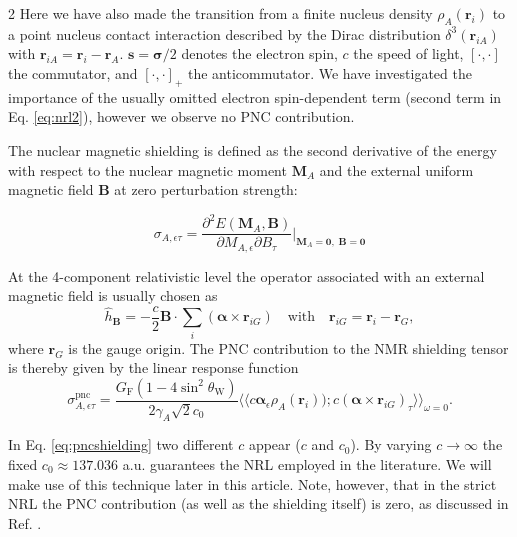 \documentclass[a4paper,12pt,english]{article}
\begin{document}
\begin{spacing}{2}
\noindent Here we have also made the transition from a finite nucleus density $\rho_A(\mathbf{r}_i)$ to a point nucleus contact interaction described by the Dirac distribution $\delta^3(\mathbf{r}_{iA})$ with $\mathbf{r}_{iA} = \mathbf{r}_i-\mathbf{r}_A$. \mbox{$\mathbf{s} = \boldsymbol{\sigma}/2$} denotes the electron spin, $c$ the speed of light, $[\cdot,\cdot]$ the commutator, and $[\cdot,\cdot]_+$ the anti\-commutator. We have investigated the importance of the usually omitted electron spin-dependent term (second term in Eq. \ref{eq:nrl2}), however we observe no PNC contribution.

\par The nuclear magnetic shielding is defined as the second derivative of the energy with respect to the nuclear magnetic moment $\mathbf{M}_A$ and the external uniform magnetic field $\mathbf{B}$ at zero perturbation strength:

\begin{equation}\label{eq:shielding}
  \sigma_{A,\epsilon\tau} = \frac{\partial^2E(\mathbf{M}_A,\mathbf{B})}{\partial{M_{A,\epsilon}}\partial{B_\tau}}\biggr|_{\mathbf{M}_A=\mathbf{0},\;\mathbf{B}=\mathbf{0}}
\end{equation}

\noindent At the 4-component relativistic level the operator associated with an external magnetic field is usually chosen as
\begin{equation}
\label{eq:hamiltonianB}
\hat{h}_\mathbf{B}=-\frac{c}{2}\mathbf{B}\cdot\sum_i\left(\boldsymbol{\alpha}\times\mathbf{r}_{iG}\right)
\quad\text{with} \quad \mathbf{r}_{iG} = \mathbf{r}_i-\mathbf{r}_G,
\end{equation}
where $\mathbf{r}_G$ is the gauge origin. The PNC contribution to the NMR shielding tensor is thereby given by the linear response function
\begin{equation}\label{eq:pncshielding}
  \sigma_{A,\epsilon\tau}^\text{pnc} = \frac{G_\text{F}(1-4\sin^2\theta_\text{W})}{2\gamma_A\sqrt{2}c_0}\langle\langle c\boldsymbol{\alpha}_\epsilon\rho_A(\mathbf{r}_i));c(\boldsymbol{\alpha}\times\mathbf{r}_{iG})_\tau\rangle\rangle_{\omega=0}.
\end{equation}

\noindent In Eq. \ref{eq:pncshielding} two different $c$ appear ($c$ and $c_0$). By varying $c \rightarrow \infty$ the fixed $c_0 \approx 137.036$ a.u. guarantees the NRL employed in the literature. We will make use of this technique later in this article. Note, however, that in the strict NRL the PNC contribution (as well as the shielding itself) is zero, as discussed in Ref. \cite{saue2005advquantumchem}.


\end{spacing}
\end{document}
